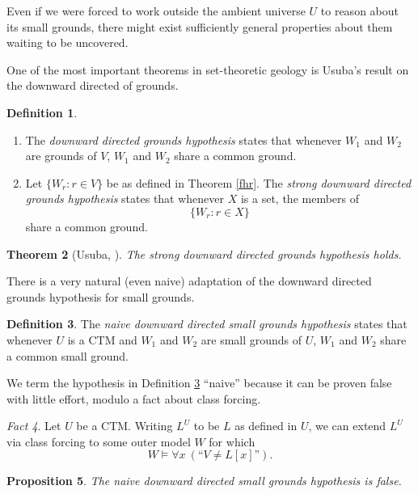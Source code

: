 \documentclass[12pt, twoside]{memoir}
\numberwithin{equation}{section}
\newtheorem{thm}{Theorem}[section]
\newtheorem{prop}[thm]{Proposition}
\theoremstyle{definition}
\newtheorem{defi}[thm]{Definition}
\theoremstyle{remark}
\newtheorem{fact}[thm]{Fact}
\theoremstyle{definition}
\theoremstyle{definition}
\theoremstyle{definition}
\theoremstyle{remark}
\begin{document}
Even if we were forced to work outside the ambient universe $U$ to reason about its small grounds, there might exist sufficiently general properties about them waiting to be uncovered.

One of the most important theorems in set-theoretic geology is Usuba's result on the downward directed of grounds.

\begin{defi}
\leavevmode
\begin{enumerate}[label=(\arabic*)]
    \item The \emph{downward directed grounds hypothesis} states that whenever $W_1$ and $W_2$ are grounds of $V$, $W_1$ and $W_2$ share a common ground.
    \item Let $\{W_r : r \in V\}$ be as defined in Theorem \ref{fhr}. The \emph{strong downward directed grounds hypothesis} states that whenever $X$ is a set, the members of $$\{W_r : r \in X\}$$ share a common ground.
\end{enumerate}
\end{defi}

\begin{thm}[Usuba, \cite{usuba}]
The strong downward directed grounds hypothesis holds.
\end{thm}

There is a very natural (even naive) adaptation of the downward directed grounds hypothesis for small grounds.

\begin{defi}\label{naiveddg}
The \emph{naive downward directed small grounds hypothesis} states that whenever $U$ is a CTM and $W_1$ and $W_2$ are small grounds of $U$, $W_1$ and $W_2$ share a common small ground.
\end{defi}

We term the hypothesis in Definition \ref{naiveddg} ``naive'' because it can be proven false with little effort, modulo a fact about class forcing.

\begin{fact}\label{naiveddgf}
Let $U$ be a CTM. Writing $L^U$ to be $L$ as defined in $U$, we can extend $L^U$ via class forcing to some outer model $W$ for which $$W \models \forall x \ (\text{``} V \neq L[x] \text{''}) \text{.}$$
\end{fact}

\begin{prop}\label{nddgfalse}
The naive downward directed small grounds hypothesis is false.
\end{prop}
\end{document}
